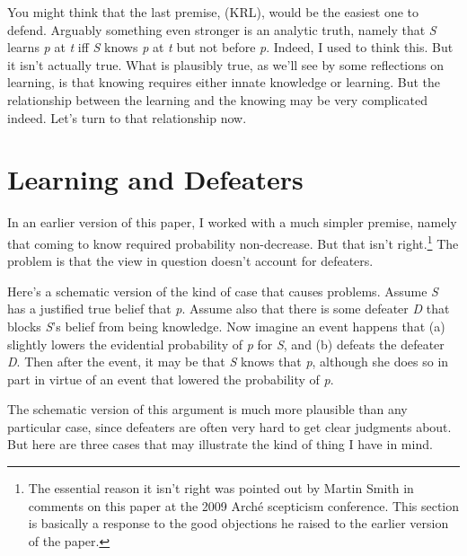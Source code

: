\documentclass[
  10pt,
  letterpaper,
  DIV=11,
  numbers=noendperiod,
  twoside]{scrartcl}
\begin{document}
You might think that the last premise, (KRL), would be the easiest one
to defend. Arguably something even stronger is an analytic truth, namely
that \emph{S} learns \emph{p} at \emph{t} iff \emph{S} knows \emph{p} at
\emph{t} but not before \emph{p}. Indeed, I used to think this. But it
isn't actually true. What is plausibly true, as we'll see by some
reflections on learning, is that knowing requires either innate
knowledge or learning. But the relationship between the learning and the
knowing may be very complicated indeed. Let's turn to that relationship
now.

\section{Learning and Defeaters}\label{learning-and-defeaters}

In an earlier version of this paper, I worked with a much simpler
premise, namely that coming to know required probability non-decrease.
But that isn't right.\footnote{The essential reason it isn't right was
  pointed out by Martin Smith in comments on this paper at the 2009
  Arché scepticism conference. This section is basically a response to
  the good objections he raised to the earlier version of the paper.}
The problem is that the view in question doesn't account for defeaters.

Here's a schematic version of the kind of case that causes problems.
Assume \emph{S} has a justified true belief that \emph{p}. Assume also
that there is some defeater \emph{D} that blocks \emph{S}'s belief from
being knowledge. Now imagine an event happens that (a) slightly lowers
the evidential probability of \emph{p} for \emph{S}, and (b) defeats the
defeater \emph{D}. Then after the event, it may be that \emph{S} knows
that \emph{p}, although she does so in part in virtue of an event that
lowered the probability of \emph{p}.

The schematic version of this argument is much more plausible than any
particular case, since defeaters are often very hard to get clear
judgments about. But here are three cases that may illustrate the kind
of thing I have in mind.
\end{document}
